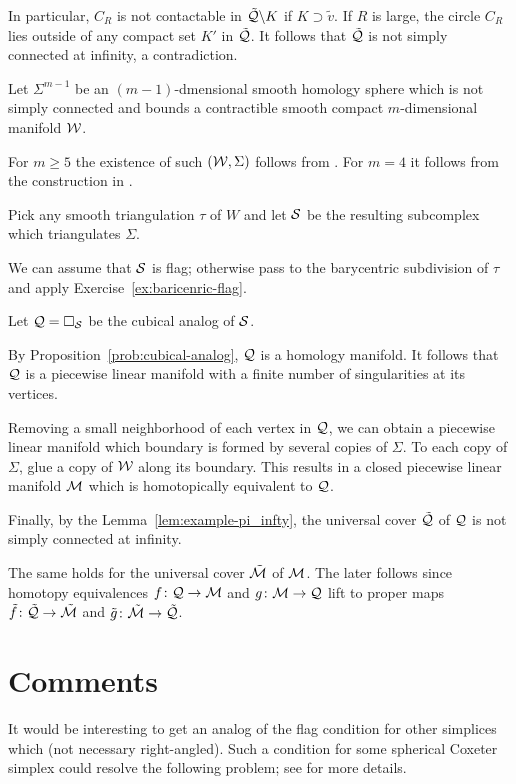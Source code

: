In particular, 
$C_R$ is not contactable in $\tilde{\mathcal{Q}}\backslash K$
if $K\supset \tilde v$.
If $R$ is large, 
the circle $C_R$  
lies outside of any compact set $K'$ in $\tilde{\mathcal{Q}}$.
It follows that $\tilde{\mathcal{Q}}$ is not simply connected at infinity, a contradiction.
\qeds

Let $\Sigma^{m-1}$ be an $(m-1)$-dmensional smooth homology sphere which is not simply connected and bounds a contractible smooth compact $m$-dimensional manifold $\mathcal{W}$. 

For $m\ge 5$ the existence of such $(\mathcal{W}, \Sigma)$ follows from \cite{kervaire}. 
For $m=4$ it follows from the construction in \cite{mazur}.

Pick any smooth triangulation $\tau$ of $W$ and let $\mathcal{S}$ be the resulting subcomplex which triangulates $\Sigma$.


We can assume that $\mathcal{S}$ is flag; 
otherwise pass to the barycentric subdivision 
of $\tau$ and apply Exercise~\ref{ex:baricenric-flag}.


Let $\mathcal{Q}=\square_{\mathcal{S}}$ be the cubical analog of $\mathcal{S}$.

By Proposition~\ref{prob:cubical-analog},
$\mathcal{Q}$ is a homology manifold.
It follows that $\mathcal{Q}$ is a piecewise linear manifold 
with a finite number of singularities at its vertices.


Removing a small neighborhood of each vertex in $\mathcal{Q}$,
we can obtain a piecewise linear manifold 
which boundary is formed by several copies of $\Sigma$.
To each copy of $\Sigma$, 
glue a copy of  $\mathcal{W}$ along its boundary.
This results in a  closed piecewise linear manifold 
$\mathcal{M}$ which is homotopically equivalent to $\mathcal{Q}$.

Finally, by the Lemma~\ref{lem:example-pi_infty},  
the universal cover $\tilde{\mathcal{Q}}$ of $\mathcal{Q}$
is not simply connected at infinity.

The same holds for 
the universal cover $\tilde{\mathcal{M}}$ of $\mathcal{M}$.
The later follows since homotopy equivalences 
$f\: \spc Q\to \spc M$ and $g\:\spc M\to \spc Q$ 
lift to proper maps 
$\tilde f \: \tilde{\spc{Q}}\to \tilde{\spc{M}}$
and $\tilde g \: \tilde{\spc{M}}\to \tilde{\spc{Q}}$. 
\qeds


\section{Comments}

It would be interesting to get an analog of the flag condition for other simplices 
which (not necessary right-angled).
Such a condition for some spherical Coxeter simplex
could resolve the following problem; 
see \cite{panov-petrunin} for more details. 

